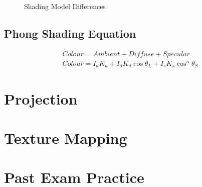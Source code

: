   \begin{figure}[!htb]
	\caption{\label{fig:normalCube} Shading Model Differences}
\end{figure}
\subsection{Phong Shading Equation}
\begin{equation}
\label{eqn:phongEqn}
\begin{split}
Colour = Ambient + Diffuse + Specular \\
Colour = I_aK_a + I_dK_d\cos{\theta_L} + I_sK_s\cos^n{\theta_S} 
\end{split}
\end{equation}

\newpage
\section{Projection}
\newpage
\section{Texture Mapping}
\newpage
\section{Past Exam Practice}